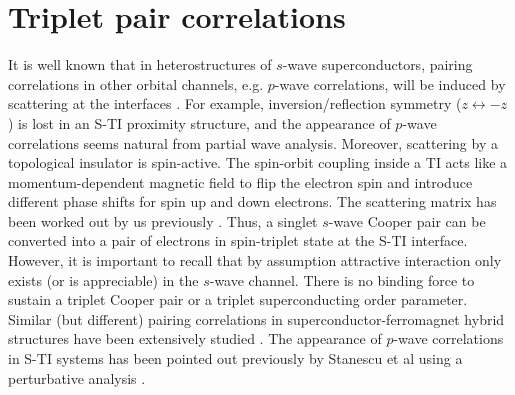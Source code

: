 \documentclass[11pt]{report}
\begin{document}
\section{Triplet pair correlations}

It is well known that in heterostructures of $s$-wave superconductors,
pairing correlations in other orbital channels, e.g. $p$-wave correlations, 
will be induced by scattering at the interfaces \cite{esch,tanaka}. For example,
inversion/reflection symmetry ($z\leftrightarrow -z$) is lost in an S-TI proximity 
structure, and the appearance of $p$-wave correlations seems natural from
 partial wave analysis. Moreover, scattering by a topological insulator is 
spin-active. The spin-orbit coupling inside a TI acts like a momentum-dependent
magnetic field to flip the electron spin and introduce different phase shifts
for spin up and down electrons. The scattering matrix has been worked out by us 
previously \cite{zhao}. Thus, a singlet $s$-wave Cooper pair can be converted into a pair
of electrons in spin-triplet state at the S-TI interface.
However, it is important to recall that by assumption attractive interaction only exists
(or is appreciable) in the $s$-wave channel. There is no binding force
to sustain a triplet Cooper pair or a triplet superconducting order parameter. 
%
Similar (but different) pairing correlations in superconductor-ferromagnet
hybrid structures have been extensively studied \cite{esch}. 
The appearance of $p$-wave correlations in S-TI systems
has been pointed out previously by Stanescu et al using a perturbative analysis \cite{stan}.
\end{document}
